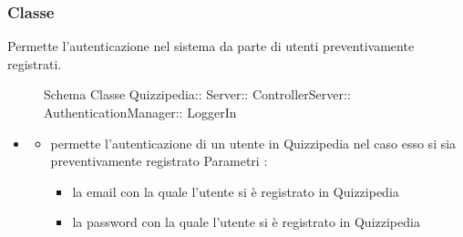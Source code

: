 \subsubsection{Classe }
Permette l'autenticazione nel sistema da parte di utenti preventivamente registrati.
\begin{figure}[H]
\centering
\noindent{}
\caption[Schema Classe LoggerIn]{Schema Classe Quizzipedia:: Server:: ControllerServer:: AuthenticationManager:: LoggerIn}
\end{figure}
\begin{itemize}
\item {}
\begin{itemize}
\item {}
\newline
permette l'autenticazione di un utente in Quizzipedia nel caso esso si sia preventivamente registrato
\newline
Parametri :
\begin{itemize}
\item {}
\newline
la email con la quale l'utente si è registrato in Quizzipedia
\item {}
\newline
la password con la quale l'utente si è registrato in Quizzipedia
\end{itemize}
\end{itemize}
\end{itemize}
